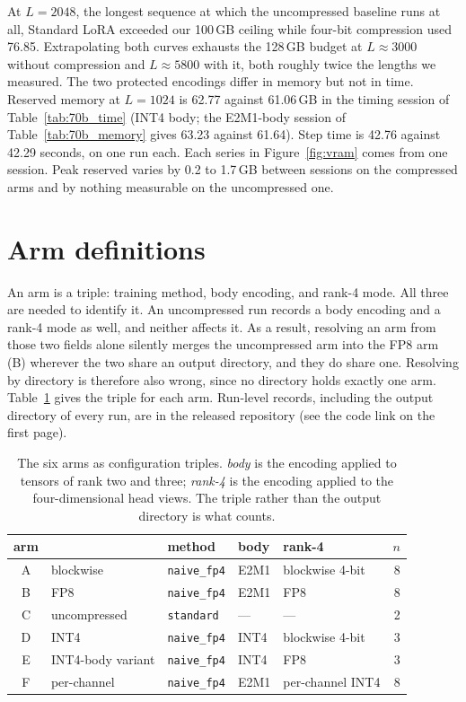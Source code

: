 \documentclass[11pt,letterpaper]{article}
\begin{document}
At $L{=}2048$, the longest sequence at which the uncompressed baseline runs at all, Standard LoRA exceeded our 100\,GB ceiling while four-bit compression used 76.85. Extrapolating both curves exhausts the 128\,GB budget at $L \approx 3000$ without compression and $L \approx 5800$ with it, both roughly twice the lengths we measured. The two protected encodings differ in memory but not in time. Reserved memory at $L{=}1024$ is 62.77 against 61.06\,GB in the timing session of Table~\ref{tab:70b_time} (INT4 body; the E2M1-body session of Table~\ref{tab:70b_memory} gives 63.23 against 61.64). Step time is 42.76 against 42.29 seconds, on one run each. Each series in Figure~\ref{fig:vram} comes from one session. Peak reserved varies by 0.2 to 1.7\,GB between sessions on the compressed arms and by nothing measurable on the uncompressed one.

\section{Arm definitions}
\label{app:arms}

An arm is a triple: training method, body encoding, and rank-4 mode. All three are needed to identify it. An uncompressed run records a body encoding and a rank-4 mode as well, and neither affects it. As a result, resolving an arm from those two fields alone silently merges the uncompressed arm into the FP8 arm (B) wherever the two share an output directory, and they do share one. Resolving by directory is therefore also wrong, since no directory holds exactly one arm. Table~\ref{tab:armmap} gives the triple for each arm. Run-level records, including the output directory of every run, are in the released repository (see the code link on the first page).

\begin{table}[htbp]
\centering
\small
\caption{The six arms as configuration triples. \emph{body} is the encoding applied to tensors of rank two and three; \emph{rank-4} is the encoding applied to the four-dimensional head views. The triple rather than the output directory is what counts.}
\label{tab:armmap}
\begin{tabular}{cllllr}
\toprule
arm & & method & body & rank-4 & $n$ \\
\midrule
A & blockwise         & \texttt{naive\_fp4} & E2M1 & blockwise 4-bit  & 8 \\
B & FP8               & \texttt{naive\_fp4} & E2M1 & FP8              & 8 \\
C & uncompressed      & \texttt{standard}   & ---  & ---              & 2 \\
D & INT4              & \texttt{naive\_fp4} & INT4 & blockwise 4-bit  & 3 \\
E & INT4-body variant & \texttt{naive\_fp4} & INT4 & FP8              & 3 \\
F & per-channel       & \texttt{naive\_fp4} & E2M1 & per-channel INT4 & 8 \\
\bottomrule
\end{tabular}
\end{table}
\end{document}
